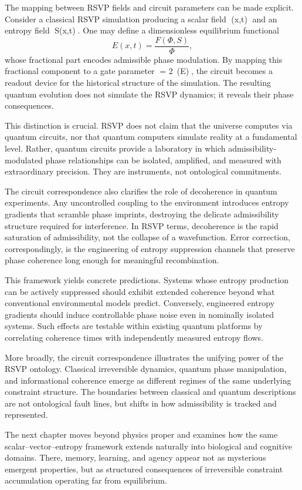 \documentclass[11pt,oneside]{book}
\begin{document}
The mapping between RSVP fields and circuit parameters can be made explicit. Consider a classical RSVP simulation producing a scalar field \Phi(x,t) and an entropy field S(x,t). One may define a dimensionless equilibrium functional
\[
E(x,t) = \frac{F(\Phi,S)}{\Phi},
\]
whose fractional part encodes admissible phase modulation. By mapping this fractional component to a gate parameter \theta = 2\pi \, (E), the circuit becomes a readout device for the historical structure of the simulation. The resulting quantum evolution does not simulate the RSVP dynamics; it reveals their phase consequences.

This distinction is crucial. RSVP does not claim that the universe computes via quantum circuits, nor that quantum computers simulate reality at a fundamental level. Rather, quantum circuits provide a laboratory in which admissibility-modulated phase relationships can be isolated, amplified, and measured with extraordinary precision. They are instruments, not ontological commitments.

The circuit correspondence also clarifies the role of decoherence in quantum experiments. Any uncontrolled coupling to the environment introduces entropy gradients that scramble phase imprints, destroying the delicate admissibility structure required for interference. In RSVP terms, decoherence is the rapid saturation of admissibility, not the collapse of a wavefunction. Error correction, correspondingly, is the engineering of entropy suppression channels that preserve phase coherence long enough for meaningful recombination.

This framework yields concrete predictions. Systems whose entropy production can be actively suppressed should exhibit extended coherence beyond what conventional environmental models predict. Conversely, engineered entropy gradients should induce controllable phase noise even in nominally isolated systems. Such effects are testable within existing quantum platforms by correlating coherence times with independently measured entropy flows.

More broadly, the circuit correspondence illustrates the unifying power of the RSVP ontology. Classical irreversible dynamics, quantum phase manipulation, and informational coherence emerge as different regimes of the same underlying constraint structure. The boundaries between classical and quantum descriptions are not ontological fault lines, but shifts in how admissibility is tracked and represented.

The next chapter moves beyond physics proper and examines how the same scalar–vector–entropy framework extends naturally into biological and cognitive domains. There, memory, learning, and agency appear not as mysterious emergent properties, but as structured consequences of irreversible constraint accumulation operating far from equilibrium.
\end{document}
